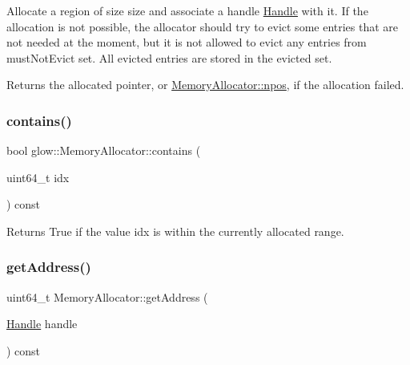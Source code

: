 Allocate a region of size {\ttfamily size} and associate a handle {\ttfamily \hyperlink{classglow_1_1_handle}{Handle}} with it. If the allocation is not possible, the allocator should try to evict some entries that are not needed at the moment, but it is not allowed to evict any entries from {\ttfamily must\+Not\+Evict} set. All evicted entries are stored in the {\ttfamily evicted} set.

\begin{DoxyReturn}{Returns}
the allocated pointer, or \hyperlink{classglow_1_1_memory_allocator_a41dc4f17fc3b4e242406d9d4a9b419d5}{Memory\+Allocator\+::npos}, if the allocation failed. 
\end{DoxyReturn}
\mbox{\label{classglow_1_1_memory_allocator_a10a5be96f3d1ec9d09c911c841db3909}} 
\subsubsection{\texorpdfstring{contains()}{contains()}}
{\footnotesize\ttfamily bool glow\+::\+Memory\+Allocator\+::contains (\begin{DoxyParamCaption}\item[{uint64\+\_\+t}]{idx }\end{DoxyParamCaption}) const\hspace{0.3cm}{\ttfamily [inline]}}

\begin{DoxyReturn}{Returns}
True if the value {\ttfamily idx} is within the currently allocated range. 
\end{DoxyReturn}
\mbox{\label{classglow_1_1_memory_allocator_a3bb026995b47d35fdb5dd4193249e705}} 
\subsubsection{\texorpdfstring{get\+Address()}{getAddress()}}
{\footnotesize\ttfamily uint64\+\_\+t Memory\+Allocator\+::get\+Address (\begin{DoxyParamCaption}\item[{\hyperlink{classglow_1_1_memory_allocator_a8ebc21e1c9250f73f2e85aca3ae4ae9d}{Handle}}]{handle }\end{DoxyParamCaption}) const}

